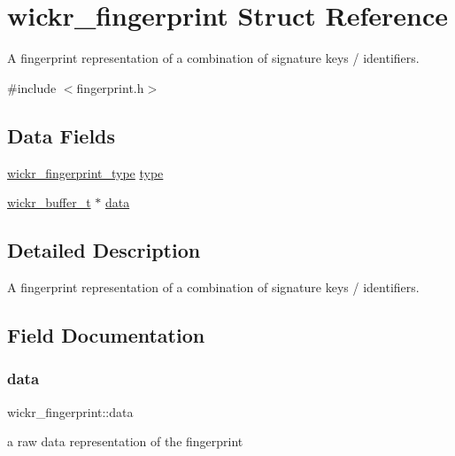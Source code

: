 \hypertarget{structwickr__fingerprint}{}\section{wickr\+\_\+fingerprint Struct Reference}
\label{structwickr__fingerprint}


A fingerprint representation of a combination of signature keys / identifiers.  




{\ttfamily \#include $<$fingerprint.\+h$>$}

\subsection*{Data Fields}
\begin{DoxyCompactItemize}
\item 
\mbox{\hyperlink{group__wickr__fingerprint_ga09d6f8936a6d1fbacb13c643c2e81810}{wickr\+\_\+fingerprint\+\_\+type}} \mbox{\hyperlink{structwickr__fingerprint_a13e5decc89e701d0b22b9a83a0205758}{type}}
\item 
\mbox{\hyperlink{structwickr__buffer}{wickr\+\_\+buffer\+\_\+t}} $\ast$ \mbox{\hyperlink{structwickr__fingerprint_a56e7c92e7c9ab8a8c0d6f6f7960eef74}{data}}
\end{DoxyCompactItemize}


\subsection{Detailed Description}
A fingerprint representation of a combination of signature keys / identifiers. 

\subsection{Field Documentation}
\mbox{\label{structwickr__fingerprint_a56e7c92e7c9ab8a8c0d6f6f7960eef74}} 
\subsubsection{\texorpdfstring{data}{data}}
{\footnotesize\ttfamily wickr\+\_\+fingerprint\+::data}

a raw data representation of the fingerprint \mbox{\label{structwickr__fingerprint_a13e5decc89e701d0b22b9a83a0205758}} 

